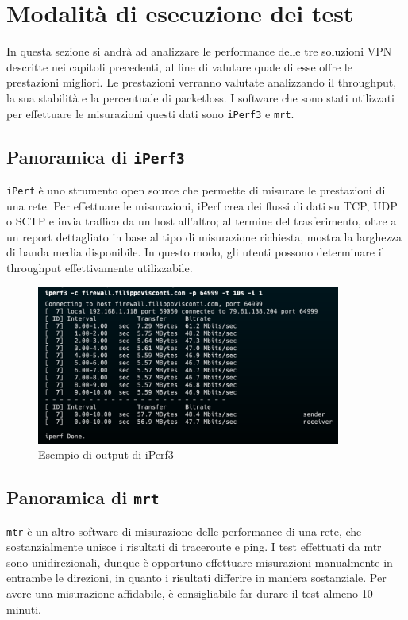 \section{Modalità di esecuzione dei test}
In questa sezione si andrà ad analizzare le performance delle tre soluzioni VPN descritte nei capitoli precedenti, al fine di valutare quale di esse offre le prestazioni migliori.
Le prestazioni verranno valutate analizzando il throughput, la sua stabilità e la percentuale di packetloss.
I software che sono stati utilizzati per effettuare le misurazioni questi dati sono \texttt{iPerf3} e \texttt{mrt}.

\subsection{Panoramica di \texttt{iPerf3}}
\texttt{iPerf} è uno strumento open source che permette di misurare le prestazioni di una rete.
Per effettuare le misurazioni, iPerf crea dei flussi di dati su TCP, UDP o SCTP e invia traffico da un host all'altro; al termine del trasferimento, oltre a un report dettagliato in base al tipo di misurazione richiesta, mostra la larghezza di banda media disponibile.
In questo modo, gli utenti possono determinare il throughput effettivamente utilizzabile.

\begin{figure}[ht]
    \centering
    \includegraphics[width=10cm]{figure/iperfSample.png}
    \caption{Esempio di output di iPerf3}
\end{figure}

\subsection{Panoramica di \texttt{mrt}}
\texttt{mtr} è un altro software di misurazione delle performance di una rete, che sostanzialmente unisce i risultati di traceroute e ping.
I test effettuati da mtr sono unidirezionali, dunque è opportuno effettuare misurazioni manualmente in entrambe le direzioni, in quanto i risultati differire in maniera sostanziale. Per avere una misurazione affidabile, è consigliabile far durare il test almeno 10 minuti.

